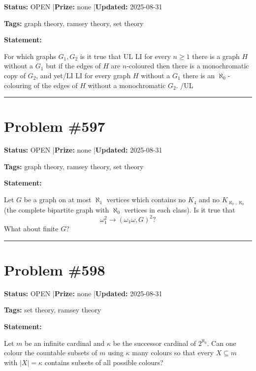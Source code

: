 \documentclass{article}
\begin{document}
\noindent\textbf{Status:} OPEN \quad|\quad \textbf{Prize:} none \quad|\quad \textbf{Updated:} 2025-08-31

\noindent\textbf{Tags:} graph theory, ramsey theory, set theory

\medskip

\noindent\textbf{Statement:}

For which graphs $G_1,G_2$ is it true that {UL} {LI} for every $n\geq 1$ there is a graph $H$ without a $G_1$ but if the edges of $H$ are $n$-coloured then there is a monochromatic copy of $G_2$, and yet{/LI} {LI} for every graph $H$ without a $G_1$ there is an $\aleph_0$-colouring of the edges of $H$ without a monochromatic $G_2$. {/UL}

\noindent\rule{\linewidth}{0.4pt}


\section{Problem \#597}
\label{prob:597}

\noindent\textbf{Status:} OPEN \quad|\quad \textbf{Prize:} none \quad|\quad \textbf{Updated:} 2025-08-31

\noindent\textbf{Tags:} graph theory, ramsey theory, set theory

\medskip

\noindent\textbf{Statement:}

Let $G$ be a graph on at most $\aleph_1$ vertices which contains no $K_4$ and no $K_{\aleph_0,\aleph_0}$ (the complete bipartite graph with $\aleph_0$ vertices in each class). Is it true that\[\omega_1^2 \to (\omega_1\omega, G)^2?\]What about finite $G$?

\noindent\rule{\linewidth}{0.4pt}


\section{Problem \#598}
\label{prob:598}

\noindent\textbf{Status:} OPEN \quad|\quad \textbf{Prize:} none \quad|\quad \textbf{Updated:} 2025-08-31

\noindent\textbf{Tags:} set theory, ramsey theory

\medskip

\noindent\textbf{Statement:}

Let $m$ be an infinite cardinal and $\kappa$ be the successor cardinal of $2^{\aleph_0}$. Can one colour the countable subsets of $m$ using $\kappa$ many colours so that every $X\subseteq m$ with $\lvert X\rvert=\kappa$ contains subsets of all possible colours?
\end{document}
